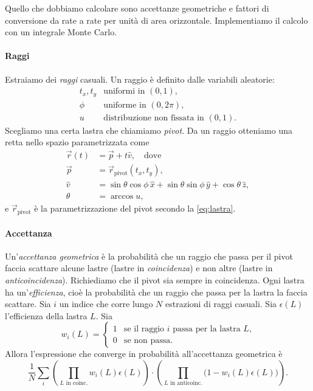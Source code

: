Quello che dobbiamo calcolare sono accettanze geometriche
e fattori di conversione da rate a rate per unità di area orizzontale.
Implementiamo il calcolo con un integrale Monte Carlo.

\paragraph{Raggi}

Estraiamo dei \emph{raggi} casuali.
Un raggio è definito dalle variabili aleatorie:
\begin{equation*}
	\begin{array}{ll}
		t_x, t_y & \text{uniformi in $(0,1)$}, \\
		\phi     & \text{uniforme in $(0,2\pi)$}, \\
		u        & \text{distribuzione non fissata in $(0,1)$}.
	\end{array}
\end{equation*}
Scegliamo una certa lastra che chiamiamo \emph{pivot}.
Da un raggio otteniamo una retta nello spazio parametrizzata come
\begin{align*}
	\vec r(t) &= \vec p + t \hat v, \quad \text{dove} \\
	\vec p    &= \vec r_\text{pivot}(t_x, t_y), \\
	\hat v    &= \sin\theta\cos\phi\,\hat x + \sin\theta\sin\phi\,\hat y + \cos\theta\,\hat z, \\
	\theta    &= \arccos u,
\end{align*}
e $\vec r_\text{pivot}$ è la parametrizzazione del pivot secondo la \eqref{eq:lastra}.

\paragraph{Accettanza}

Un'\emph{accettanza geometrica} è la probabilità
che un raggio che passa per il pivot
faccia scattare alcune lastre (lastre in \emph{coincidenza})
e non altre (lastre in \emph{anticoincidenza}).
Richiediamo che il pivot sia sempre in coincidenza.
Ogni lastra ha un'\emph{efficienza},
cioè la probabilità che un raggio che passa per la lastra la faccia scattare.
Sia $i$ un indice che corre lungo $N$ estrazioni di raggi casuali.
Sia $\epsilon(L)$ l'efficienza della lastra $L$.
Sia
\begin{equation*}
	w_i(L) = \begin{cases}
		1 & \text{se il raggio $i$ passa per la lastra $L$,} \\
		0 & \text{se non passa.}
	\end{cases}
\end{equation*}
Allora l'espressione che converge in probabilità all'accettanza geometrica è
\begin{equation*}
	\frac1N \sum_i
	\left( \prod_\text{$L$ in coinc.} w_i(L) \epsilon(L) \right)
	\cdot \left( \prod_\text{$L$ in anticoinc.} \big(1 - w_i(L) \epsilon(L)\big) \right).
\end{equation*}

